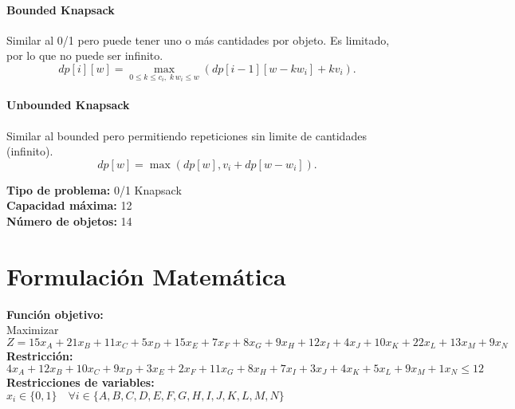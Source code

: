 \documentclass{article}
\begin{document}
\paragraph{Bounded Knapsack} Similar al 0/1 pero puede tener uno o más cantidades por objeto. Es limitado, por lo que no puede ser infinito. 
\[
dp[i][w] = 
\max_{0 \leq k \leq c_i,\; k\,w_i \leq w} \left( dp[i-1][w - k w_i] + k v_i \right).
\]

\paragraph{Unbounded Knapsack} Similar al bounded pero permitiendo repeticiones sin limite de cantidades (infinito).
\[
dp[w] = \max ( dp[w], v_i + dp[w - w_i] ).
\]

\thispagestyle{empty}
\newpage
\textbf{Tipo de problema:} 0/1 Knapsack\\
\textbf{Capacidad máxima:} 12\\
\textbf{Número de objetos:} 14\\

\section*{Formulación Matemática}
\textbf{Función objetivo:}\\
Maximizar $Z = 15 x_{A} + 21 x_{B} + 11 x_{C} + 5 x_{D} + 15 x_{E} + 7 x_{F} + 8 x_{G} + 9 x_{H} + 12 x_{I} + 4 x_{J} + 10 x_{K} + 22 x_{L} + 13 x_{M} + 9 x_{N}$\\

\textbf{Restricción:}\\
$4 x_{A} + 12 x_{B} + 10 x_{C} + 9 x_{D} + 3 x_{E} + 2 x_{F} + 11 x_{G} + 8 x_{H} + 7 x_{I} + 3 x_{J} + 4 x_{K} + 5 x_{L} + 9 x_{M} + 1 x_{N} \leq 12$\\

\textbf{Restricciones de variables:}\\
$x_i \in \{0, 1\} \quad \forall i \in \{A, B, C, D, E, F, G, H, I, J, K, L, M, N\}$\\
\vspace{0.5cm}
\end{document}
